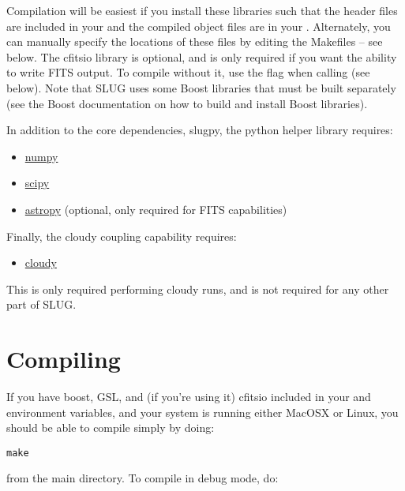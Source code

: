 \documentclass[letterpaper,10pt,english]{sphinxmanual}
\begin{document}
Compilation will be easiest if you install these libraries such that the header files are included in your  and the compiled object files are in your . Alternately, you can manually specify the locations of these files by editing the Makefiles -- see below. The cfitsio library is optional, and is only required if you want the ability to write FITS output. To compile without it, use the flag  when calling  (see below). Note that SLUG uses some Boost libraries that must be built separately (see the Boost documentation on how to build and install Boost libraries).

In addition to the core dependencies, slugpy, the python helper library requires:
\begin{itemize}
\item {} 
\href{http://www.numpy.org/}{numpy}

\item {} 
\href{http://www.scipy.org/}{scipy}

\item {} 
\href{http://www.astropy.org/}{astropy} (optional, only required for FITS capabilities)

\end{itemize}

Finally, the cloudy coupling capability requires:
\begin{itemize}
\item {} 
\href{http://nublado.org}{cloudy}

\end{itemize}

This is only required performing cloudy runs, and is not required for any other part of SLUG.


\section{Compiling}
\label{compiling:compiling}
If you have boost, GSL, and (if you're using it) cfitsio included in your  and  environment variables, and your system is running either MacOSX or Linux, you should be able to compile simply by doing:

\begin{Verbatim}[commandchars=\\\{\}]
make
\end{Verbatim}

from the main  directory. To compile in debug mode, do:
\end{document}
